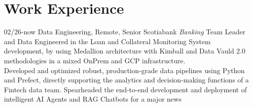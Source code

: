 \section{Work Experience}

\begin{entrylist}
  \entry
    {02/26-now}
    {Data Engineering, Remote, Senior}
    {Scotiabank {\sl Banking}}
    {Team Leader and Data Engineered in the Loan and Collateral Monitoring System development,
    by using Medallion architecture with Kimball and Data Vauld 2.0 methodologies in a mixed
    OnPrem and GCP infrastructure. \\
    Developed and optimized robust, production-grade data pipelines using Python and Prefect, directly
    supporting the analytics and decision-making functions of a Fintech data team. Spearheaded the
    end-to-end development and deployment of intelligent AI Agents and RAG Chatbots for a major news
    }
\end{entrylist}

